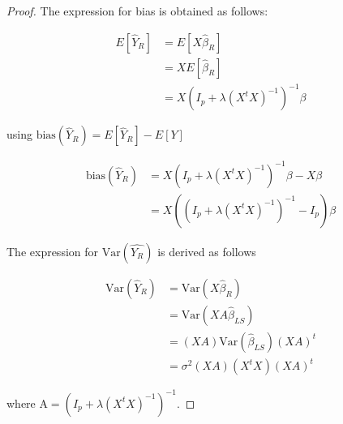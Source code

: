 \documentclass[paper=a4, fontsize=11pt]{scrartcl} %
\numberwithin{equation}{section} %
\begin{document}
\begin{proof}

The expression for bias is obtained as follows:

\begin{align}
E[\hat{Y}_R] &= E[X \hat{\beta}_R] \\
&= X E[\hat{\beta}_R] \\
&= X (I_p + \lambda (X^t X)^{-1})^{-1} \beta
\end{align}

using $\text{bias}(\hat{Y}_R) = E[\hat{Y}_R] - E[Y]$

\begin{align}
\textrm{bias}(\hat{Y}_R) &= X (I_p + \lambda (X^t X)^{-1})^{-1} \beta - X \beta \\
&= X ((I_p + \lambda (X^t X)^{-1})^{-1} - I_p) \beta
\end{align}

The expression for $\textrm{Var}(\hat{Y_R})$ is derived as follows

\begin{align}
\textrm{Var}(\hat{Y}_R) &= \text{Var}(X \hat{\beta}_R) \\
&= \text{Var}(X A \hat{\beta}_{LS}) \\
&= (XA) \text{Var}(\hat{\beta}_{LS})(XA)^t \\
&= \sigma^2(XA)(X^t X)(XA)^t
\end{align}

where $\textrm{A} = (I_p + \lambda (X^t X)^{-1})^{-1}$.

\end{proof}
\end{document}
